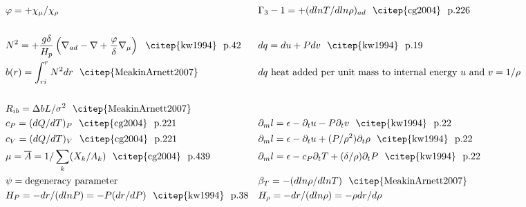 \documentclass[12pt,paper=a4]{report}
\begin{document}
\begin{table}[!h]
\begin{align}
  & \varphi = +\chi_\mu/\chi_\rho  & & \Gamma_3 -1 = +(d ln T/d ln \rho)_{ad} \ \ \mbox{\citep{cg2004} \ p.226} \nonumber \\  
  & & & \nonumber \\  
  & N^2 = +\frac{g \delta}{H_p} \left( \nabla_{ad} - \nabla + \frac{\varphi}{\delta}\nabla_\mu \right) \ \ \mbox{\citep{kw1994} \ p.42}  & & dq = du + Pdv \ \ \mbox{\citep{kw1994} \ p.19} \nonumber \\
  &  b(r) = \int_{ri}^r N^2 dr \ \ {\mbox{\citep{MeakinArnett2007}}} & & dq \ \mbox{heat added per unit mass to internal energy} \ u \ \mbox{and} \ v = 1/\rho  \nonumber \\
  & & & \nonumber \\    
&  R_{ib} = \Delta b L/\sigma^2 \ \ {\mbox{\citep{MeakinArnett2007}}} & & \nonumber \\  
&  c_P = (dQ/dT)_P \ \ \mbox{\citep{cg2004} \ p.221} & & \partial_m l = \epsilon - \partial_t u - P\partial_t v \ \ \mbox{\citep{kw1994} \ p.22} \nonumber \\
&  c_V = (dQ/dT)_V  \ \ \mbox{\citep{cg2004} \ p.221} & & \partial_m l = \epsilon - \partial_t u + (P/\rho^2) \partial_t \rho \ \ \mbox{\citep{kw1994} \ p.22} \nonumber \\
& \mu = \overline{A} = 1/\sum_k (X_k/A_k) \ \ \mbox{\citep{cg2004} \ p.439} & & \partial_m l = \epsilon - c_P \partial_t T + (\delta/\rho)\partial_t P \ \ \mbox{\citep{kw1994} \ p.22} \nonumber \\
  & \psi = \mbox{degeneracy parameter} & & \beta_T = -(d ln \rho/d ln T)  \ \ {\mbox{\citep{MeakinArnett2007}}} \nonumber \\
& H_P = -dr/(d ln P) = -P (dr/dP) \ \ \mbox{\citep{kw1994} \ p.38} & & H_\rho =  -dr/(d ln \rho) = -\rho dr/d\rho \nonumber   %
\end{align} 
\end{table}


\end{document}
